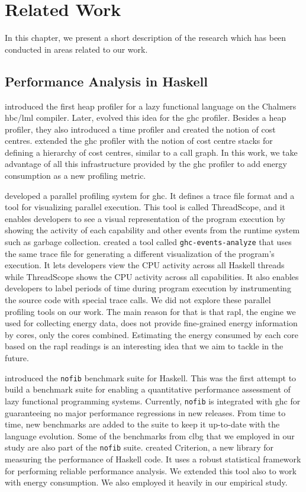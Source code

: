 \chapter{Related Work}\label{chp:related}
In this chapter, we present a short description of the research which has been conducted in areas related to our work.


\section{Performance Analysis in Haskell}
 introduced the first heap profiler for a lazy functional language on the Chalmers hbc/lml compiler. Later,  evolved this idea for the \ac{ghc} profiler. Besides a heap profiler, they also introduced a time profiler and created the notion of cost centres.  extended the \ac{ghc} profiler with the notion of cost centre stacks for defining a hierarchy of cost centres, similar to a call graph. In this work, we take advantage of all this infrastructure provided by the \ac{ghc} profiler to add energy consumption as a new profiling metric.

 developed a parallel profiling system for \ac{ghc}. It defines a trace file format and a tool for visualizing parallel execution. This tool is called ThreadScope, and it enables developers to see a visual representation of the program execution by showing the activity of each capability and other events from the runtime system such as garbage collection.  created a tool called \texttt{ghc-events-analyze} that uses the same trace file for generating a different visualization of the program's execution. It lets developers view the CPU activity across all Haskell threads while ThreadScope shows the CPU activity across all capabilities. It also enables developers to label periods of time during program execution by instrumenting the source code with special trace calls. We did not explore these parallel profiling tools on our work. The main reason for that is that \ac{rapl}, the engine we used for collecting energy data, does not provide fine-grained energy information by cores, only the cores combined. Estimating the energy consumed by each core based on the \ac{rapl} readings is an interesting idea that we aim to tackle in the future.

 introduced the \texttt{nofib} benchmark suite for Haskell. This was the first attempt to build a benchmark suite for enabling a quantitative performance assessment of lazy functional programming systems. Currently, \texttt{nofib} is integrated with \ac{ghc} for guaranteeing no major performance regressions in new releases. From time to time, new benchmarks are added to the suite to keep it up-to-date with the language evolution. Some of the benchmarks from \acl{clbg} that we employed in our study are also part of the \texttt{nofib} suite.  created Criterion, a new library for measuring the performance of Haskell code. It uses a robust statistical framework for performing reliable performance analysis. We extended this tool also to work with energy consumption. We also employed it heavily in our empirical study.


